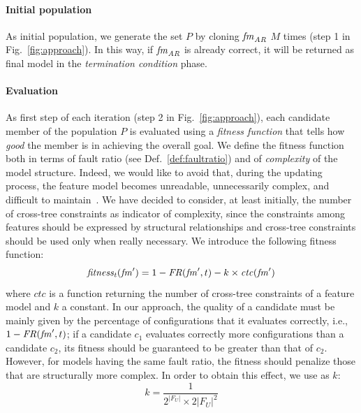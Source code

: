 \begin{tikzborder}{\cite{Gargantini16:validation}}
\begin{tikzborder}{\cite{gargantini_combinatorial_2017}}
\begin{tikzborder}{\cite{garn2019}}
\begin{tikzborder}{\cite{arcaini2019achieving}}
	\paragraph{\bf Initial population}%
	
	\bb
	As initial population, we generate the set $P$ by cloning $\mathit{fm}_{\mathit{AR}}$ $M$ times (step 1 in Fig.~\ref{fig:approach}). In this way, if $\mathit{fm}_{\mathit{AR}}$ is already correct, it will be returned as final model in the \emph{termination condition} phase.
	\be
	
	\paragraph{\bf Evaluation}%
	\bb As first step of each iteration (step 2 in Fig.~\ref{fig:approach}), each candidate member \fmp of the population $P$ is evaluated using a \emph{fitness function} that tells how \emph{good} the member is in achieving the overall goal. We define the fitness function both in terms of fault ratio (see Def.~\ref{def:faultratio}) and of {\it complexity} of the model structure. Indeed, we would like to avoid that, during the updating process, the feature model becomes unreadable, unnecessarily complex, and difficult to maintain~\cite{Berger2013,visualSupport,ComprehendingFeatureModels,FeatureIDEbook}. We have decided to consider, at least initially, the number of cross-tree constraints as indicator of complexity, since the constraints among features should be expressed by structural relationships and cross-tree constraints should be used only when really necessary. We introduce the following fitness function:\be
	\begin{equation}\label{eq:fitness}
	\mathit{fitness_t}(\mathit{fm}^\prime) = 1 - \mathit{FR}(\mathit{fm}^\prime, t) - k \times \mathit{ctc}(\mathit{fm}^\prime)
	\end{equation}
	\bb where $\mathit{ctc}$ is a function returning the number of cross-tree constraints of a feature model and $k$ a constant. In our approach, the quality of a candidate must be mainly given by the percentage of configurations that it evaluates correctly, i.e., $1 - \mathit{FR}(\mathit{fm}^\prime, t)$; if a candidate $c_1$ evaluates correctly more configurations than a candidate $c_2$, its fitness should be guaranteed to be greater than that of $c_2$. However, for models having the same fault ratio, the fitness should penalize those that are structurally more complex. In order to obtain this effect, we use as $k$:\be
	\begin{equation}\label{eq:kFitness}
	k = \frac{1}{{2^{|F_U|} \times 2|F_U|^2}}
	\end{equation}
	

\end{tikzborder}
\end{tikzborder}
\end{tikzborder}
\end{tikzborder}

